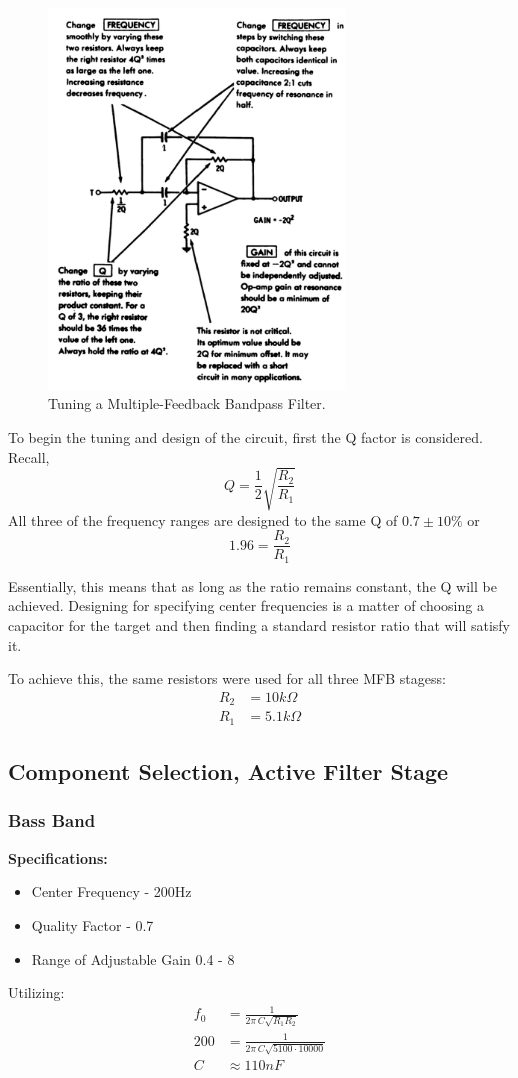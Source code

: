 \documentclass[12pt]{article}
\begin{document}
\begin{figure}[H]
	\centering
	\includegraphics[width=0.7\textwidth]{tuning}
	\caption{Tuning a Multiple-Feedback Bandpass Filter.}
	\label{fig:tuning}
\end{figure}
To begin the tuning and design of the circuit, first the Q factor is considered. Recall,
\[
	Q = \frac{1}{2}\sqrt{\frac{R_2}{R_1}}
\]
All three of the frequency ranges are designed to the same Q of $0.7 \pm 10\%$ or
\[
	1.96 = \frac{R_2}{R_1}
\]

Essentially, this means that as long as the ratio remains constant, the Q will be achieved.
Designing for specifying center frequencies is a matter of choosing a capacitor for the target and then finding a standard resistor ratio that will satisfy it.

To achieve this, the same resistors were used for all three MFB stagess:
\begin{align*}
	R_2 & = 10k\Omega  \\
	R_1 & = 5.1k\Omega
\end{align*}
\subsection{Component Selection, Active Filter Stage}
\subsubsection{Bass Band}
\noindent \textbf{Specifications:}
\begin{itemize}
	\item Center Frequency - 200Hz
	\item Quality Factor - 0.7
	\item Range of Adjustable Gain 0.4 - 8
\end{itemize}
Utilizing:
\begin{align*}
	f_0 & = \frac{1}{2\pi\,C\sqrt{R_1R_2}}         \\
	200 & = \frac{1}{2\pi\,C\sqrt{5100\cdot10000}} \\
	C   & \approx 110nF                            \\
\end{align*}
\end{document}
